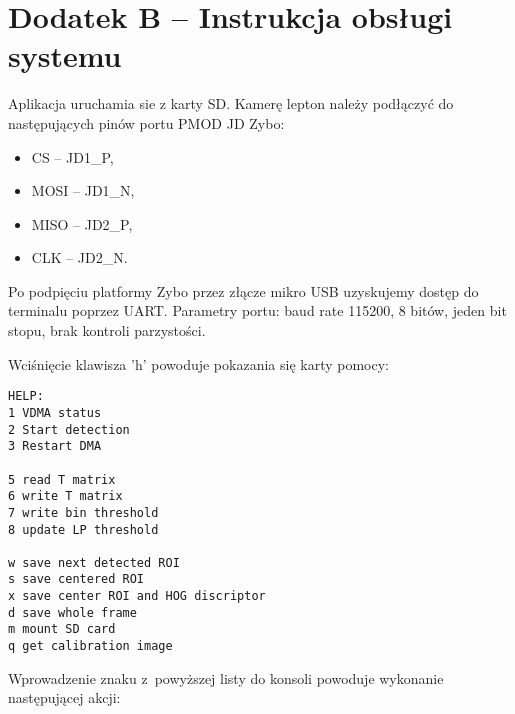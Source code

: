 \chapter{Dodatek B -- Instrukcja obsługi systemu}


Aplikacja uruchamia sie z karty SD. Kamerę lepton należy podłączyć do następujących pinów portu PMOD JD Zybo:

\begin{itemize}
\item CS -- JD1\_P,
\item MOSI -- JD1\_N,
\item MISO -- JD2\_P,
\item CLK -- JD2\_N.
\end{itemize}

Po podpięciu platformy Zybo przez złącze mikro USB uzyskujemy dostęp do terminalu poprzez UART. 
Parametry portu: baud rate 115200, 8 bitów, jeden bit stopu, brak kontroli parzystości.

Wciśnięcie klawisza 'h' powoduje pokazania się karty pomocy:

\begin{lstlisting}
HELP:
1 VDMA status
2 Start detection
3 Restart DMA

5 read T matrix
6 write T matrix
7 write bin threshold
8 update LP threshold

w save next detected ROI
s save centered ROI
x save center ROI and HOG discriptor
d save whole frame
m mount SD card
q get calibration image

\end{lstlisting}
 
\noindent Wprowadzenie znaku z~powyższej listy do konsoli powoduje wykonanie następującej akcji:
 
